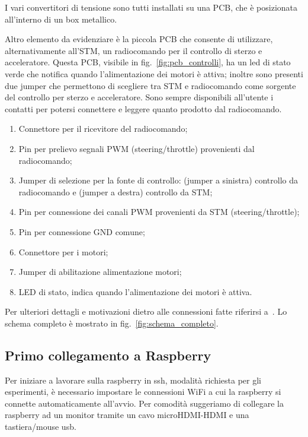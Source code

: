 I vari convertitori di tensione sono tutti installati su una PCB, che è posizionata all’interno di un box metallico.

Altro elemento da evidenziare \`e la piccola PCB che consente di utilizzare, alternativamente all’STM, un radiocomando per il controllo di sterzo e acceleratore.
Questa PCB, visibile in fig.~\ref{fig:pcb_controlli}, ha un led di stato verde che notifica quando l’alimentazione dei motori è attiva; 
inoltre sono presenti due jumper che permettono di scegliere tra STM e radiocomando come sorgente del controllo per sterzo e acceleratore. 
Sono sempre disponibili all’utente i contatti per potersi connettere e leggere quanto prodotto dal radiocomando.

\begin{enumerate}
    \item Connettore per il ricevitore del radiocomando;
    \item Pin per prelievo segnali PWM (steering/throttle) provenienti dal radiocomando;
    \item Jumper di selezione per la fonte di controllo: (jumper a sinistra) controllo da radiocomando e (jumper a destra) controllo da STM;
	\item Pin per connessione dei canali PWM provenienti da STM (steering/throttle);
    \item Pin per connessione GND comune;
    \item Connettore per i motori;
    \item Jumper di abilitazione alimentazione motori;
    \item LED di stato, indica quando l'alimentazione dei motori è attiva.
\end{enumerate}

Per ulteriori dettagli e motivazioni dietro alle connessioni fatte riferirsi a~\cite{ptvlocalizzazione}.
Lo schema completo è mostrato in fig.~\ref{fig:schema_completo}.


\subsection{Primo collegamento a Raspberry}
\label{sez: primo collegamento a raspberry}

Per iniziare a lavorare sulla raspberry in ssh, modalit\`a richiesta per gli esperimenti, \`e necessario impostare le connessioni WiFi a cui la raspberry si
connette automaticamente all'avvio. Per comodit\`a suggeriamo di collegare la raspberry ad un monitor tramite un cavo microHDMI-HDMI e una tastiera/mouse usb.

